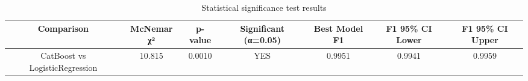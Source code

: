 \begin{table}
\caption{Statistical significance test results}
\label{tab:significance}
\begin{tabular}{ccccccc}
\midrule
Comparison & McNemar χ² & p-value & Significant (α=0.05) & Best Model F1 & F1 95\% CI Lower & F1 95\% CI Upper \\
\midrule
CatBoost vs LogisticRegression & 10.815 & 0.0010 & YES & 0.9951 & 0.9941 & 0.9959 \\
\bottomrule
\end{tabular}
\end{table}
